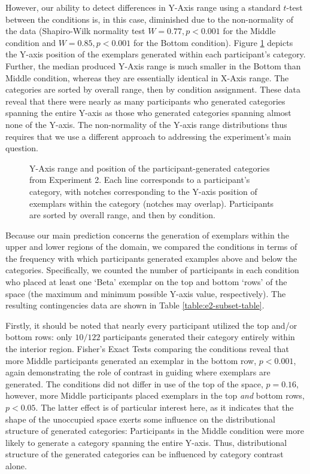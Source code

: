 \documentclass[12pt]{article}
\newcommand\inputpgf[2]{{
\let\pgfimageWithoutPath\pgfimage
\renewcommand{\pgfimage}[2][]{\pgfimageWithoutPath[##1]{#1/##2}}

}}
\begin{document}
\begin{flushleft}
However, our ability to detect differences in Y-Axis range using a standard
$t$-test between the conditions is, in this case, diminished due to the
non-normality of the data (Shapiro-Wilk normality test $W=0.77, p< 0.001$ for
the Middle condition and $W=0.85, p < 0.001$ for the Bottom condition). Figure
\ref{fig:e2-yranges} depicts the Y-axis position of the exemplars generated
within each participant's category. Further, the median produced Y-Axis range is much smaller in the Bottom than Middle condition, whereas they are essentially identical in X-Axis range. The categories are sorted by overall range,
then by condition assignment. These data reveal that there were nearly as many
participants who generated categories spanning the entire Y-axis as those who
generated categories spanning almost none of the Y-axis. The non-normality of
the Y-axis range distributions thus requires that we use a different approach to
addressing the experiment's main question.

\begin{figure}
    \begin{center} \inputpgf{figs/}{e2-yranges.pgf}
    \caption{Y-Axis range and position of the participant-generated categories
from Experiment 2. Each line corresponds to a participant's category, with
notches corresponding to the Y-axis position of exemplars within the category
(notches may overlap). Participants are sorted by overall range, and then by
condition. }
    \label{fig:e2-yranges}
    \end{center}
\end{figure}

Because our main prediction concerns the generation of exemplars within the
upper and lower regions of the domain, we compared the conditions in terms of
the frequency with which participants generated examples above and below the
categories. Specifically, we counted the number of participants in each
condition who placed at least one `Beta' exemplar on the top and bottom `rows'
of the space (the maximum and minimum possible Y-axis value, respectively). The
resulting contingencies data are shown in Table \ref{table:e2-subset-table}.

Firstly, it should be noted that nearly every participant utilized the top
and/or bottom rows: only $10 / 122$ participants generated their category
entirely within the interior region. Fisher's Exact Tests comparing the
conditions reveal that more Middle participants generated an exemplar in the
bottom row, $p < 0.001$, again demonstrating the role of contrast in guiding
where exemplars are generated. The conditions did not differ in use of the top
of the space, $p = 0.16$, however, more Middle participants placed exemplars in
the top {\em and} bottom rows, $p < 0.05$. The latter effect is of particular interest
here, as it indicates that the shape of the unoccupied space exerts some
influence on the distributional structure of generated categories: Participants
in the Middle condition were more likely to generate a category spanning the
entire Y-axis. Thus, distributional structure of the generated categories can be
influenced by category contrast alone.


\end{flushleft}
\end{document}
